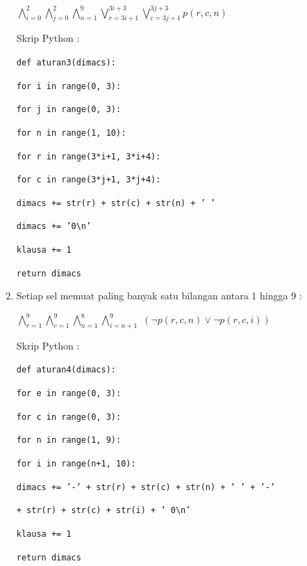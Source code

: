 \begin{enumerate}
	$\bigwedge_{i=0}^{2}$$\bigwedge_{j=0}^{2}$$\bigwedge_{n=1}^{9}$$\bigvee_{r=3i+1}^{3i+3}$$\bigvee_{c=3j+1}^{3j+3}$$p\left(r,c,n\right)$
	
	
	\vspace{5mm}
	
	Skrip Python :
	
	\vspace{5mm}
	
	\texttt{def aturan3(dimacs):}
	
	\quad \quad\texttt{for i in range(0, 3):}
	
	\quad \quad \quad\texttt{for j in range(0, 3):}
	
	\quad \quad \quad \quad\texttt{for n in range(1, 10):}
	
	\quad\quad\quad\quad\quad\texttt{for r in range(3*i+1, 3*i+4):}
	
	\quad\quad\quad\quad\quad\quad\texttt{for c in range(3*j+1, 3*j+4):}
	
	\quad\quad\quad\quad\quad\quad\quad\texttt{dimacs += str(r) + str(c) + str(n) + ' '}
	
	\quad\quad\quad\quad\quad\texttt{dimacs += '0\textbackslash n'}
	
	\quad\quad\quad\quad\quad\texttt{klausa += 1}
	
	\quad\quad\texttt{return dimacs}
	
	\vspace{5mm}
	
	
	\item Setiap sel memuat paling banyak satu bilangan antara 1 hingga 9 : 
	
	$\bigwedge_{r=1}^{9}$$\bigwedge_{c=1}^{9}$$\bigwedge_{n=1}^{8}$$\bigwedge_{i=n+1}^{9}$
	$\left(\neg p\left(r,c,n\right)\vee\neg p\left(r,c,i\right)\right)$
	
	
	\vspace{5mm}
	
	Skrip Python :
	
	\vspace{5mm}
	
	\texttt{def aturan4(dimacs):}
	
	\quad \quad\texttt{for e in range(0, 3):}
	
	\quad \quad \quad\texttt{for c in range(0, 3):}
	
	\quad \quad \quad \quad\texttt{for n in range(1, 9):}
	
	\quad\quad\quad\quad\quad\texttt{for i in range(n+1, 10):}
	
	\quad\quad\quad\quad\quad\quad\texttt{dimacs += '-' + str(r) + str(c) + str(n) + ' ' + '-'} 
	
	\quad\quad\quad\quad\quad\quad\texttt{+ str(r) + str(c) + str(i) + ' 0\textbackslash n'}
	
	\quad\quad\quad\quad\quad\texttt{klausa += 1}
	
	\quad \quad\texttt{return dimacs}
	
\end{enumerate}

